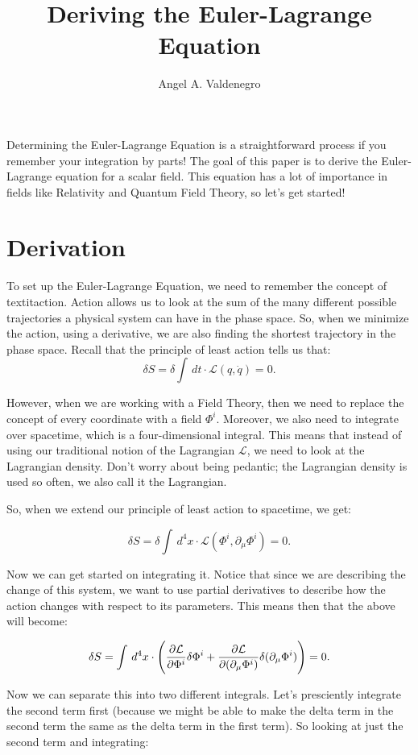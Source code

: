 \documentclass{article}
\title{Deriving the Euler-Lagrange Equation}
\author{Angel A. Valdenegro}
\newcommand{\lagr}{\mathcal{L}}
\newcommand{\phim}{\Phi^{i}}
\newcommand{\elpot}{\pdv{\lagr}{\phim}}
\newcommand{\pmu}[1]{\partial_{#1}}
\newcommand{\elmom}{\pdv{\lagr}{(\pmu{\mu}\phim)}}
\begin{document}
\maketitle

Determining the Euler-Lagrange Equation is a straightforward process if you remember your integration by parts! The goal of this paper is to derive the Euler-Lagrange equation for a scalar field. This equation has a lot of importance in fields like Relativity and Quantum Field Theory, so let's get started!

\section*{Derivation}
To set up the Euler-Lagrange Equation, we need to remember the concept of textit{action}. Action allows us to look at the sum of the many different possible trajectories a physical system can have in the phase space. So, when we minimize the action, using a derivative, we are also finding the shortest trajectory in the phase space. Recall that the principle of least action tells us that: 
\[
    \delta S = \delta \int \,dt \cdot \lagr (q, \dot{q}) = 0
.\] 

However, when we are working with a Field Theory, then we need to replace the concept of every coordinate with a field $\phim$. Moreover, we also need to integrate over spacetime, which is a four-dimensional integral. This means that instead of using our traditional notion of the Lagrangian $\lagr$, we need to look at the Lagrangian density. Don't worry about being pedantic; the Lagrangian density is used so often, we also call it the Lagrangian.

So, when we extend our principle of least action to spacetime, we get:

\[
    \delta S = \delta \int \,d^4 x \cdot \lagr (\phim, \pmu{\mu}\phim) = 0
.\] 

Now we can get started on integrating it. Notice that since we are describing the change of this system, we want to use partial derivatives to describe how the action changes with respect to its parameters. This means then that the above will become:

\[
    \delta S = \int \,d^4 x \cdot \Bigg(\elpot \delta \phim + \elmom \delta (\pmu{\mu}\phim) \Bigg) = 0
.\] 

Now we can separate this into two different integrals. Let's presciently integrate the second term first (because we might be able to make the delta term in the second term the same as the delta term in the first term). So looking at just the second term and integrating:
\end{document}
